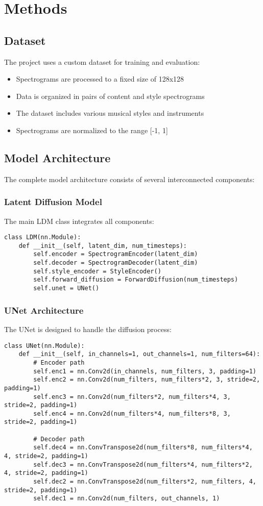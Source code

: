 \section{Methods}

\subsection{Dataset}
The project uses a custom dataset for training and evaluation:
\begin{itemize}
    \item Spectrograms are processed to a fixed size of 128x128
    \item Data is organized in pairs of content and style spectrograms
    \item The dataset includes various musical styles and instruments
    \item Spectrograms are normalized to the range [-1, 1]
\end{itemize}

\subsection{Model Architecture}
The complete model architecture consists of several interconnected components:

\subsubsection{Latent Diffusion Model}
The main LDM class integrates all components:
\begin{lstlisting}
class LDM(nn.Module):
    def __init__(self, latent_dim, num_timesteps):
        self.encoder = SpectrogramEncoder(latent_dim)
        self.decoder = SpectrogramDecoder(latent_dim)
        self.style_encoder = StyleEncoder()
        self.forward_diffusion = ForwardDiffusion(num_timesteps)
        self.unet = UNet()
\end{lstlisting}

\subsubsection{UNet Architecture}
The UNet is designed to handle the diffusion process:
\begin{lstlisting}
class UNet(nn.Module):
    def __init__(self, in_channels=1, out_channels=1, num_filters=64):
        # Encoder path
        self.enc1 = nn.Conv2d(in_channels, num_filters, 3, padding=1)
        self.enc2 = nn.Conv2d(num_filters, num_filters*2, 3, stride=2, padding=1)
        self.enc3 = nn.Conv2d(num_filters*2, num_filters*4, 3, stride=2, padding=1)
        self.enc4 = nn.Conv2d(num_filters*4, num_filters*8, 3, stride=2, padding=1)
        
        # Decoder path
        self.dec4 = nn.ConvTranspose2d(num_filters*8, num_filters*4, 4, stride=2, padding=1)
        self.dec3 = nn.ConvTranspose2d(num_filters*4, num_filters*2, 4, stride=2, padding=1)
        self.dec2 = nn.ConvTranspose2d(num_filters*2, num_filters, 4, stride=2, padding=1)
        self.dec1 = nn.Conv2d(num_filters, out_channels, 1)
\end{lstlisting}

